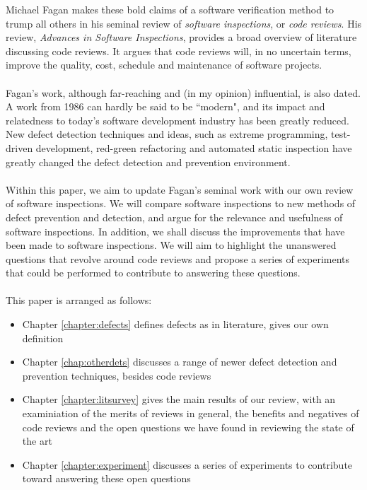 Michael Fagan \cite{AdvancesInSoftwareInspection} makes these bold claims of a
software verification method to trump all others in his seminal review of {\em
  software inspections}, or {\em code reviews}.
His review, {\it Advances in Software Inspections}, provides a broad overview of
literature discussing code reviews.
It argues that code reviews will, in no uncertain terms, improve the quality,
   cost, schedule and maintenance of software projects.\\
\\
Fagan's work, although far-reaching and (in my opinion) influential, is also
dated.
A work from 1986 can hardly be said to be ``modern", and its impact and
relatedness to today's software development industry has been greatly reduced.
New defect detection techniques and ideas, such as extreme programming,
test-driven development, red-green refactoring and automated static
inspection have greatly changed the defect detection and prevention
environment.\\
\\
Within this paper, we aim to update Fagan's seminal work with our own
review of software inspections.
We will compare software inspections to new methods of defect prevention and
detection, and argue for the relevance and usefulness of software inspections.
In addition, we shall discuss the improvements that have been made to software
inspections.
We will aim to highlight the unanswered questions that revolve around code
reviews and propose a series of experiments that could be performed to
contribute to answering these questions.\\
\\
This paper is arranged as follows:
\begin{itemize}
  \item Chapter \ref{chapter:defects} defines defects as in literature, gives
  our own definition 
  \item Chapter \ref{chap:otherdets} discusses a range of newer defect detection
  and prevention techniques, besides code reviews
  \item Chapter \ref{chapter:litsurvey} gives the main results of our review, with
  an examiniation of the merits of reviews in general, the benefits and
  negatives of code reviews and the open questions we have found in reviewing
  the state of the art
  \item Chapter \ref{chapter:experiment} discusses a series of experiments to
  contribute toward answering these open questions
\end{itemize}
